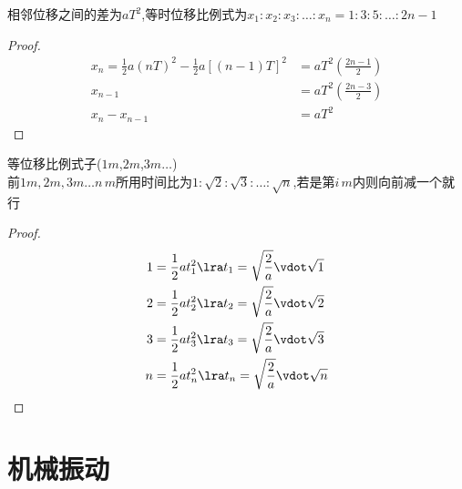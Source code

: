 \documentclass{article}
\begin{document}
\begin{corollary*}
    相邻位移之间的差为$aT^{2}$,等时位移比例式为$x_{1}:x_{2}:x_{3} : \dots : x_{n} = 1:3:5: \dots :2n-1  $
\end{corollary*}
\begin{proof}
    \begin{align*}
        x_{n} = \frac{1}{2}a (nT)^{2} -  \frac{1}{2}a [(n-1)T]^{2} & = aT^{2} (\frac{2n-1}{2}) \\
        x_{n-1}                                                    & = aT^{2} (\frac{2n-3}{2}) \\
        x_{n} - x_{n-1}                                            & = aT^{2}
    \end{align*}
\end{proof}

\begin{corollary*}
    等位移比例式子($1m$,$2m$,$3m \dots$)    \\
    前$1m,2m,3m \dots n \, m$所用时间比为$1:\sqrt{2}:\sqrt{3}:\dots:\sqrt{n}$,若是第$i\,m$内则向前减一个就行
    \begin{proof}
        \begin{align*}
            1 & = \frac{1}{2}a t_{1}^{2} \lra t_{1} =\sqrt{\frac{2}{a}} \vdot \sqrt{1} \\
            2 & = \frac{1}{2}a t_{2}^{2} \lra t_{2} =\sqrt{\frac{2}{a}} \vdot \sqrt{2} \\
            3 & = \frac{1}{2}a t_{3}^{2} \lra t_{3} =\sqrt{\frac{2}{a}} \vdot \sqrt{3} \\
            n & = \frac{1}{2}a t_{n}^{2} \lra t_{n} =\sqrt{\frac{2}{a}} \vdot \sqrt{n} \\
        \end{align*}
    \end{proof}
\end{corollary*}

\vspace{2em}

\section{机械振动}
\end{document}
